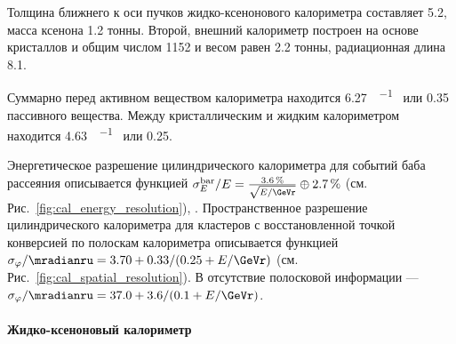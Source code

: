 Толщина ближнего к оси пучков жидко-ксенонового калориметра составляет \SI{5.2}{\Xrad},
масса ксенона \num{1.2} тонны. 
Второй,
внешний калориметр построен на основе кристаллов  и  общим числом \num{1152} и весом равен \num{2.2} тонны, 
радиационная длина \SI{8.1}{\Xrad}.

Суммарно перед активном веществом калориметра находится 
\SI{6.27}{\gr \per \cubed \cmr} или \SI{0.35}{\Xrad} пассивного вещества.
Между кристаллическим и жидким калориметром находится 
\SI{4.63}{\gr \per \cubed \cmr} или \SI{0.25}{\Xrad}.

Энергетическое разрешение цилиндрического калориметра для событий баба рассеяния описывается функцией
$\sigma_E^{\text{bar}} / E = \frac{ \SI{3.6}{\percent} }{ \sqrt{ E / \si{\GeVr} } } \oplus \SI{2.7}{\percent}$
(см. Рис.~\ref{fig:cal_energy_resolution}), \cite{Anisenkov:2017pgv}.
Пространственное разрешение цилиндрического калориметра для кластеров с восстановленной точкой конверсией по полоскам  калориметра описывается функцией
$\sigma_{\varphi} / \si{\mradianru} = 3.70 + 0.33 / (0.25 + E / \si{\GeVr})$ (см. Рис.~\ref{fig:cal_spatial_resolution}).
В отсутствие полосковой информации
---
$\sigma_{\varphi} / \si{\mradianru} = 37.0 + 3.6 / (0.1 + E / \si{\GeVr})$.



\paragraph{Жидко-ксеноновый калориметр}\label{sec:lxe}

